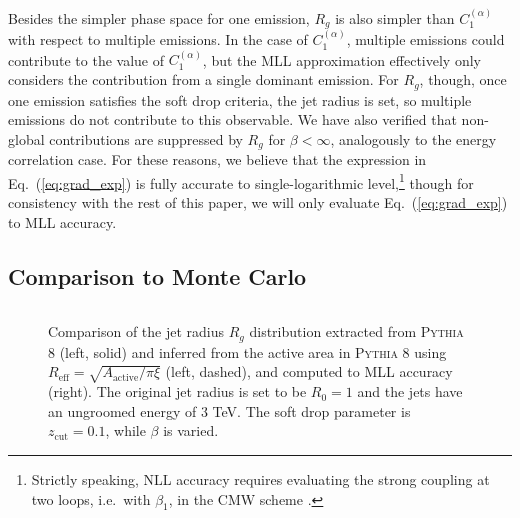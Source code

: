 \documentclass[letterpaper,11pt]{article}
\newcommand{\C}[2]{C^{(#2)}_{#1}}
\newcommand{\ea}{{\C{1}{\alpha}}}
\DeclareRobustCommand{\Eq}[1]{Eq.~(\ref{#1})}
\newcommand{\pythia}[1]{\textsc{Pythia\xspace #1}}
\begin{document}
Besides the simpler phase space for one emission, $R_g$ is also simpler than $\ea$ with respect to multiple emissions.  In the case of $\ea$, multiple emissions could contribute to the value of $\ea$, but the MLL approximation effectively only considers the contribution from a single dominant emission.  For $R_g$, though, once one emission satisfies the soft drop criteria, the jet radius is set, so multiple emissions do not contribute to this observable. We have also verified that non-global contributions are suppressed by $R_g$ for $\beta<\infty$, analogously to the energy correlation case. For these reasons, we believe that the expression in \Eq{eq:grad_exp} is fully accurate to single-logarithmic level,\footnote{Strictly speaking, NLL accuracy requires evaluating the strong coupling at two loops, i.e.\ with $\beta_1$, in the CMW scheme \cite{Catani:1990rr}.} though for consistency with the rest of this paper, we will only evaluate  \Eq{eq:grad_exp}  to MLL accuracy.


\subsection{Comparison to Monte Carlo}
\begin{figure}[]
\begin{center}
$\quad$

\end{center}
\caption{ Comparison of the jet radius $R_g$ distribution extracted
  from \pythia{8} (left, solid) and inferred from the active area in
  \pythia{8} using $R_\text{eff} =\sqrt{A_\text{active}/\pi \xi}$
  (left, dashed), and computed to MLL accuracy (right).  The original
  jet radius is set to be $R_0 = 1$ and the jets have an ungroomed
  energy of $3$ TeV.  The soft drop parameter is $z_\text{cut}=0.1$,
  while $\beta$ is varied.  }
\label{fig:rad_dist}
\end{figure}
\end{document}

